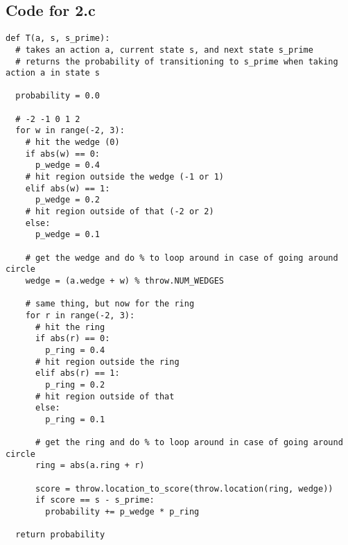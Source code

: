 \documentclass{article}
\begin{document}
\subsection*{Code for 2.c}
\begin{verbatim}
def T(a, s, s_prime):
  # takes an action a, current state s, and next state s_prime
  # returns the probability of transitioning to s_prime when taking action a in state s
  
  probability = 0.0

  # -2 -1 0 1 2
  for w in range(-2, 3):
    # hit the wedge (0)
    if abs(w) == 0:
      p_wedge = 0.4
    # hit region outside the wedge (-1 or 1)
    elif abs(w) == 1:
      p_wedge = 0.2
    # hit region outside of that (-2 or 2)
    else:
      p_wedge = 0.1

    # get the wedge and do % to loop around in case of going around circle
    wedge = (a.wedge + w) % throw.NUM_WEDGES

    # same thing, but now for the ring
    for r in range(-2, 3):
      # hit the ring
      if abs(r) == 0:
        p_ring = 0.4
      # hit region outside the ring
      elif abs(r) == 1:
        p_ring = 0.2
      # hit region outside of that
      else:
        p_ring = 0.1

      # get the ring and do % to loop around in case of going around circle
      ring = abs(a.ring + r)

      score = throw.location_to_score(throw.location(ring, wedge))
      if score == s - s_prime:
        probability += p_wedge * p_ring

  return probability
\end{verbatim}
\end{document}
